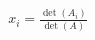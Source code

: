 \documentclass[preview]{standalone}
\begin{document}
\begin{align*}
x_i = \frac{\det(A_i)}{ \det(A) }
\end{align*}
\end{document}
